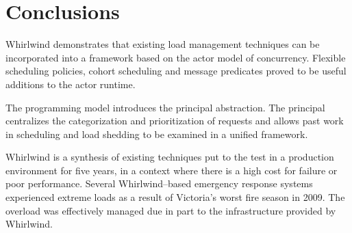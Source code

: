 \documentclass[conference]{IEEEtran}
\begin{document}
\section{Conclusions}

Whirlwind demonstrates that existing load management techniques can be incorporated into a framework based on the actor model of concurrency. Flexible scheduling policies, cohort scheduling and message predicates proved to be useful additions to the actor runtime. 

The programming model introduces the principal abstraction. The principal centralizes the categorization and prioritization of requests and allows past work in scheduling and load shedding to be examined in a unified framework.

Whirlwind is a synthesis of existing techniques put to the test in a production environment for five years, in a context where there is a high cost for failure or poor performance. Several Whirlwind--based emergency response systems experienced extreme loads as a result of Victoria's worst fire season in 2009. The overload was effectively managed due in part to the infrastructure provided by Whirlwind.



\end{document}
